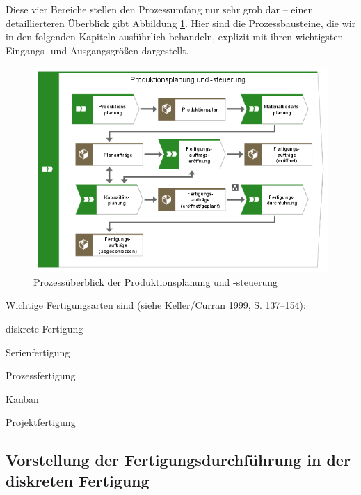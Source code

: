 Diese vier Bereiche stellen den Prozessumfang nur sehr grob dar – einen detaillierteren Überblick gibt Abbildung \ref{fig:Prozessüberblick der Produktionsplanung und -steuerung}. Hier sind die Prozessbausteine, die wir in den folgenden Kapiteln ausführlich behandeln, explizit mit ihren wichtigsten Eingangs- und Ausgangsgrößen dargestellt.


\begin{figure}[H]
	\centering 
    \includegraphics[width=\textwidth]{img/Produktion.png}	
    \caption[Prozessüberblick der Produktionsplanung und -steuerung]
    {Prozessüberblick der Produktionsplanung und -steuerung \protect\footnotemark}
    \label{fig:Prozessüberblick der Produktionsplanung und -steuerung}
\end{figure}


Wichtige Fertigungsarten sind (siehe Keller/Curran 1999, S. 137–154): 

diskrete Fertigung 

Serienfertigung 

Prozessfertigung 

Kanban 

Projektfertigung



\subsection{Vorstellung der Fertigungsdurchführung in der diskreten Fertigung}


